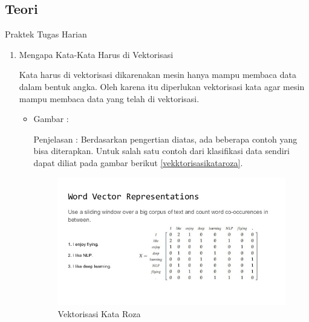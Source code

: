 \subsection{Teori}
Praktek Tugas Harian 
\begin{enumerate}

\item Mengapa Kata-Kata Harus di Vektorisasi
\par Kata harus di vektorisasi dikarenakan mesin hanya mampu membaca data dalam bentuk angka. Oleh karena itu diperlukan vektorisasi kata agar mesin mampu membaca data yang telah di vektorisasi. 
\par
\begin{itemize}
\item Gambar :
\par Penjelasan : Berdasarkan pengertian diatas, ada beberapa contoh yang bisa diterapkan. Untuk salah satu contoh dari klasifikasi data sendiri dapat diliat pada gambar berikut \ref{vekktorisasikataroza}.
\begin{figure}[!hbtp]
\centering
\includegraphics[scale=0.6]{figures/vekktorisasikataroza.jpg}
\caption{Vektorisasi Kata Roza}
\label{text-fadila}
\end{figure}
\end{itemize}


\end{enumerate}
